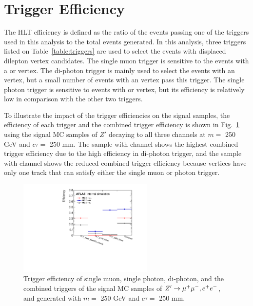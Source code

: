 \section{Trigger Efficiency}
\label{sec:trigger_efficiency}
The HLT efficiency is defined as the ratio of the events passing one of the triggers used in this analysis to the total events generated. In this analysis, three triggers listed on Table~\ref{table:triggers} are used to select the events with displaced dilepton vertex candidates. The single muon trigger is sensitive to the events with a \mumu or \emu vertex. The di-photon trigger is mainly used to select the events with an \ee vertex, but a small number of events with an \emu vertex pass this trigger. The single photon trigger is sensitive to events with \ee or \emu vertex, but its efficiency is relatively low in comparison with the other two triggers.

To illustrate the impact of the trigger efficiencies on the signal samples, the efficiency of each trigger and the combined trigger efficiency is shown in Fig.~\ref{fig:m_trig_eff_allchannel} using the signal MC samples of $Z'$ decaying to all three channels at $m = $ 250 GeV and $c\tau=$ 250 mm. The sample with \ee channel shows the highest combined trigger efficiency due to the high efficiency in di-photon trigger, and the sample with \emu channel shows the reduced combined trigger efficiency because \emu vertices have only one track that can satisfy either the single muon or photon trigger.

\begin{figure}[!htb]
	\includegraphics[width=0.60\textwidth]{figures/m_dv_eff_trig_allchannel.pdf}
	\centering
	\caption{Trigger efficiency of single muon, single photon, di-photon, and the combined triggers of the signal MC samples of $Z'\rightarrow\mu^{+}\mu^{-}, e^{+}e^{-}$, and \emu generated with $m=$ 250 GeV and $c\tau=$ 250 mm.}
	\label{fig:m_trig_eff_allchannel}
\end{figure}

